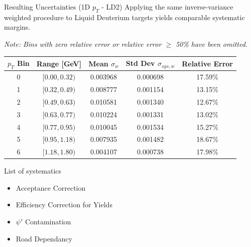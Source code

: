 \documentclass[aspectratio=169]{beamer}
\begin{document}
\begin{frame}{Resulting Uncertainties (1D $p_T$ - LD2)}
    Applying the same inverse-variance weighted procedure to Liquid Deuterium targets yields comparable systematic margins.
    
    \textit{Note: Bins with zero relative error or relative error $\geq$ 50\% have been omitted.}
    \vspace{0.3cm}
    
    \begin{table}[]
        \centering
        \begin{tabular}{@{}ccccc@{}}
        \toprule
        \textbf{$p_T$ Bin} & \textbf{Range [GeV]} & \textbf{Mean $\sigma_w$} & \textbf{Std Dev $\sigma_{sys,w}$} & \textbf{Relative Error} \\ \midrule
        0 & $[0.00, 0.32)$ & 0.003968 & 0.000698 & 17.59\% \\
        1 & $[0.32, 0.49)$ & 0.008777 & 0.001154 & 13.15\% \\
        2 & $[0.49, 0.63)$ & 0.010581 & 0.001340 & 12.67\% \\
        3 & $[0.63, 0.77)$ & 0.010224 & 0.001331 & 13.02\% \\
        4 & $[0.77, 0.95)$ & 0.010045 & 0.001534 & 15.27\% \\
        5 & $[0.95, 1.18)$ & 0.007935 & 0.001482 & 18.67\% \\
        6 & $[1.18, 1.80)$ & 0.004107 & 0.000738 & 17.98\% \\
        \bottomrule
        \end{tabular}
    \end{table}
\end{frame}

\begin{frame}{List of systematics}
    \begin{itemize}
        \item Acceptance Correction
        \item Efficiency Correction for Yields
        \item $\psi'$ Contamination
        \item Road Dependancy
    \end{itemize}
\end{frame}
\end{document}
